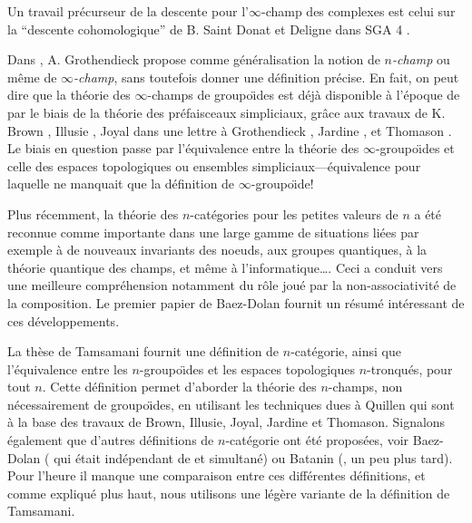 \documentclass[12pt]{article}
\begin{document}
Un travail pr\'ecurseur de la descente pour l'$\infty$-champ des complexes est
celui sur
la ``descente cohomologique'' de B. Saint Donat et Deligne dans SGA 4
\cite{SGA4b}.


Dans \cite
{Grothendieck}, A. Grothendieck propose comme
g\'en\'eralisation la notion de {\em $n$-champ} ou m\^eme de {\em
$\infty$-champ}, sans toutefois donner une d\'efinition
pr\'ecise.  En fait, on peut dire que
la th\'eorie des $\infty$-champs de groupo\"{\i}des
est d\'ej\`a disponible
\`a l'\'epoque de \cite{Grothendieck}
par le biais de la
th\'eorie des pr\'efaisceaux simpliciaux, gr\^ace aux travaux de K. Brown
\cite{KBrown}, Illusie \cite{Illusie},  Joyal dans une lettre \`a Grothendieck
\cite{Joyal}, Jardine \cite{Jardine}, et Thomason \cite{Thomason}. Le biais
en question passe par
l'\'equivalence entre la th\'eorie des
$\infty$-groupo\"{\i}des et celle des espaces topologiques ou ensembles
simpliciaux---\'equivalence pour laquelle ne manquait que la d\'efinition de
$\infty$-groupo\"{\i}de!

Plus r\'ecemment, la th\'eorie des $n$-cat\'egories pour les petites valeurs de
$n$ a \'et\'e reconnue comme importante dans une large gamme de situations
li\'ees  par exemple \`a de nouveaux invariants des noeuds, aux groupes
quantiques,
\`a la th\'eorie quantique des champs, et m\^eme \`a l'informatique\ldots .
Ceci a conduit vers une meilleure compr\'ehension notamment du r\^ole jou\'e
par la non-associativit\'e de la composition. Le premier papier de Baez-Dolan
\cite{BaezDolan} fournit un r\'esum\'e int\'eressant de ces d\'eveloppements.

La th\`ese de Tamsamani \cite{Tamsamani} fournit une
d\'efinition de $n$-cat\'egorie,
ainsi que l'\'e\-qui\-va\-len\-ce entre les $n$-groupo\"{\i}des et
les espaces topologiques $n$-tronqu\'es, pour tout $n$. Cette d\'efinition
permet d'aborder la th\'eorie des $n$-champs, non n\'ecessairement de
groupo\"{\i}des,  en utilisant les
techniques dues \`a Quillen qui sont \`a  la base des travaux de Brown, Illusie,
Joyal, Jardine et Thomason. Signalons \'egalement que
d'autres d\'efinitions de $n$-cat\'egorie
ont \'et\'e propos\'ees, voir Baez-Dolan (\cite{BaezDolanLetter}
\cite{BaezDolanIII} qui \'etait ind\'ependant de \cite{Tamsamani} et
simultan\'e) ou Batanin (\cite{Batanin}, un peu plus tard).
Pour l'heure il manque une
comparaison entre ces diff\'erentes d\'efinitions, et comme expliqu\'e plus
haut, nous utilisons une l\'eg\`ere variante de la d\'efinition de
Tamsamani.
\end{document}
